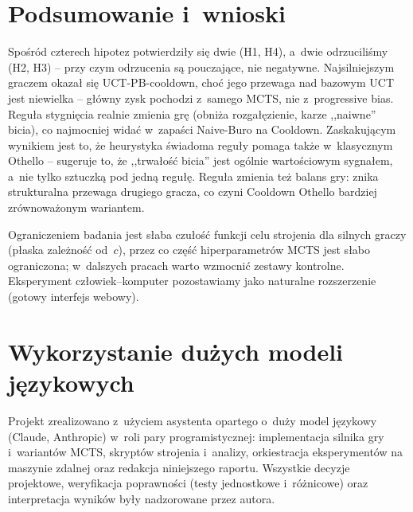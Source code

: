 \documentclass[12pt,a4paper]{article}
\begin{document}
\section{Podsumowanie i~wnioski}
Spośród czterech hipotez potwierdziły się dwie (H1, H4), a~dwie odrzuciliśmy (H2, H3) -- przy czym
odrzucenia są pouczające, nie negatywne.
Najsilniejszym graczem okazał się UCT-PB-cooldown, choć jego przewaga nad bazowym UCT jest
niewielka -- główny zysk pochodzi z~samego MCTS, nie z~progressive bias. Reguła stygnięcia realnie
zmienia grę (obniża rozgałęzienie, karze ,,naiwne'' bicia), co najmocniej widać w~zapaści
Naive-Buro na Cooldown. Zaskakującym wynikiem jest to, że heurystyka świadoma reguły pomaga także
w~klasycznym Othello -- sugeruje to, że ,,trwałość bicia'' jest ogólnie wartościowym sygnałem, a~nie
tylko sztuczką pod jedną regułę. Reguła zmienia też balans gry: znika strukturalna przewaga
drugiego gracza, co czyni Cooldown Othello bardziej zrównoważonym wariantem.

Ograniczeniem badania jest słaba czułość funkcji celu strojenia dla silnych graczy (płaska
zależność od~$c$), przez co część hiperparametrów MCTS jest słabo ograniczona; w~dalszych pracach
warto wzmocnić zestawy kontrolne. Eksperyment człowiek--komputer pozostawiamy jako naturalne
rozszerzenie (gotowy interfejs webowy).

\section{Wykorzystanie dużych modeli językowych}
Projekt zrealizowano z~użyciem asystenta opartego o~duży model językowy (Claude, Anthropic) w~roli
pary programistycznej: implementacja silnika gry i~wariantów MCTS, skryptów strojenia i~analizy,
orkiestracja eksperymentów na maszynie zdalnej oraz redakcja niniejszego raportu. Wszystkie decyzje
projektowe, weryfikacja poprawności (testy jednostkowe i~różnicowe) oraz interpretacja wyników były
nadzorowane przez autora.


\end{document}
